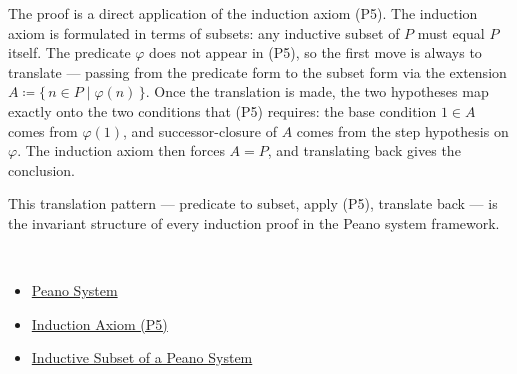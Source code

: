 \begin{remark*}
The proof is a direct application of the induction axiom (P5). The induction
axiom is formulated in terms of subsets: any inductive subset of $P$ must
equal $P$ itself. The predicate $\varphi$ does not appear in (P5), so the
first move is always to translate --- passing from the predicate form to the
subset form via the extension $A \coloneqq \{\,n \in P \mid \varphi(n)\,\}$.
Once the translation is made, the two hypotheses map exactly onto the two
conditions that (P5) requires: the base condition $1 \in A$ comes from
$\varphi(1)$, and successor-closure of $A$ comes from the step hypothesis on
$\varphi$. The induction axiom then forces $A = P$, and translating back gives
the conclusion.

This translation pattern --- predicate to subset, apply (P5), translate back
--- is the invariant structure of every induction proof in the Peano system
framework.
\end{remark*}

\begin{remark*}[Dependencies]~\\
\begin{itemize}
  \item \hyperref[def:peano-system]{Peano System}
  \item \hyperref[ax:peano-induction]{Induction Axiom (P5)}
  \item \hyperref[def:inductive-subset-of-peano-system]{Inductive Subset of a Peano System}
\end{itemize}
\end{remark*}
